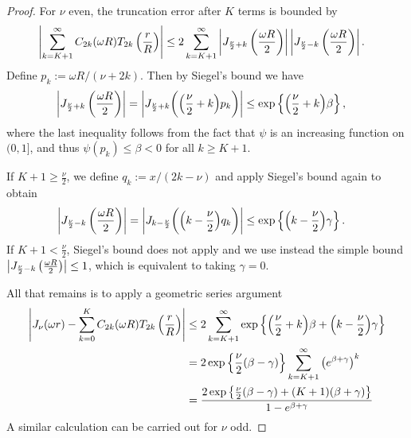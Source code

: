 \begin{proof}
    For $\nu$ even, the truncation error after $K$ terms is bounded by
    \begin{align}
        \left|\sum_{k=K+1}^\infty C_{2k}(\omega R) T_{2k}\left( \frac{r}{R} \right)\right|
        &\leq 2\sum_{k=K+1}^\infty \left|J_{\frac{\nu}{2} + k}\left(\frac{\omega R}{2}\right)\right| \left|J_{\frac{\nu}{2} - k}\left(\frac{\omega R}{2}\right)\right|.
    \end{align}
    Define $p_k := \omega R / (\nu + 2k)$. Then by Siegel's bound
    \cite[10.14.5]{olver2010nist} we have
    \begin{align}
        \left|J_{\frac{\nu}{2} + k}\left(\frac{\omega R}{2}\right)\right|
        &= \left|J_{\frac{\nu}{2} + k}\bigg(\Big(\frac{\nu}{2} + k\Big) p_k\bigg)\right|
        \leq \exp\left\{ \Big(\frac{\nu}{2} + k\Big) \beta \right\},
    \end{align}
    where the last inequality follows from the fact that $\psi$ is an increasing
    function on $(0,1]$, and thus $\psi\left(p_k\right) \leq \beta < 0$
    for all $k \geq K+1$. 
    
    If $K+1 \geq \frac{\nu}{2}$, we define $q_k := x / (2k -
    \nu)$ and apply Siegel's bound again to obtain
    \begin{align}
        \left|J_{\frac{\nu}{2} - k}\left(\frac{\omega R}{2}\right)\right|
        &= \left|J_{k - \frac{\nu}{2}}\bigg(\Big(k - \frac{\nu}{2}\Big) q_k\bigg)\right| 
        \leq \exp\left\{ \Big(k - \frac{\nu}{2}\Big) \gamma \right\}.
    \end{align}
    If $K+1 < \frac{\nu}{2}$, Siegel's bound does not apply and we use instead
    the simple bound $\left|J_{\frac{\nu}{2} - k}\left(\frac{\omega R}{2}\right)\right|
    \leq 1$, which is equivalent to taking $\gamma = 0$. 

    All that remains is to apply a geometric series argument
    \begin{align}
        \left|J_\nu(\omega r) - \sum_{k=0}^K C_{2k}(\omega R) T_{2k}\left( \frac{r}{R} \right)\right|
        &\leq 2\sum_{k=K+1}^\infty \exp\left\{ \Big(\frac{\nu}{2} + k\Big) \beta + \Big(k - \frac{\nu}{2}\Big) \gamma \right\} \\
        &= 2\exp\left\{\frac{\nu}{2}(\beta - \gamma)\right\} \sum_{k=K+1}^\infty \left( e^{\beta + \gamma} \right)^k \\
        &= \frac{2\exp\left\{ \frac{\nu}{2}(\beta - \gamma) + (K+1)(\beta + \gamma) \right\}}{1 - e^{\beta + \gamma}}
    \end{align}
    A similar calculation can be carried out for $\nu$ odd.
\end{proof}


